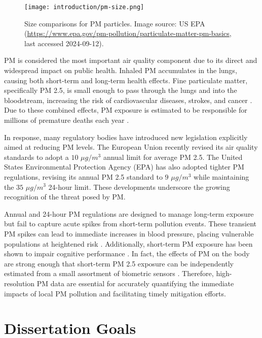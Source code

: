 \begin{figure}[!h]
  \centering
  \texttt{[image: introduction/pm-size.png]}
  \caption{Size comparisons for PM particles. Image source: US EPA
    (\url{https://www.epa.gov/pm-pollution/particulate-matter-pm-basics}, last
    accessed 2024-09-12).}
  \label{fig:pm-size-scale}
\end{figure}

PM is considered the most important air quality component due to its direct and
widespread impact on public health. Inhaled PM accumulates in the lungs, causing
both short-term and long-term health effects. Fine particulate matter,
specifically PM 2.5, is small enough to pass through the lungs and into the
bloodstream, increasing the risk of cardiovascular diseases, strokes, and cancer
\cite{pm-diesease-1, pm-disease-2, pm-cancer}. Due to these combined effects, PM
exposure is estimated to be responsible for millions of premature deaths each
year \cite{pm-mortality-1, pm-mortality-2}.

In response, many regulatory bodies have introduced new legislation explicitly aimed
at reducing PM levels. The European Union recently revised its air quality
standards to adopt a $10$ $\mu g/m^3$ annual limit for average PM 2.5.
The United States Environmental Protection Agency (EPA) has also adopted tighter
PM regulations, revising its annual PM 2.5 standard to $9$ $\mu g/m^3$ while
maintaining the $35$ $\mu g/m^3$ 24-hour limit.
These developments underscore the growing recognition of the threat posed by PM.

Annual and 24-hour PM regulations are designed to manage long-term exposure but
fail to capture acute spikes from short-term pollution events. These
transient PM spikes can lead to immediate increases in blood pressure, placing
vulnerable populations at heightened risk \cite{pm-bp}. Additionally, short-term
PM exposure has been shown to impair cognitive performance \cite{pm-cognition}.
In fact, the effects of PM on the body are strong enough that short-term PM 2.5
exposure can be independently estimated from a small assortment of biometric
sensors \cite{shawhin-biometrics, shisir-biometrics}. Therefore, high-resolution
PM data are essential for accurately quantifying the immediate impacts of local
PM pollution and facilitating timely mitigation efforts.

\section{Dissertation Goals}

